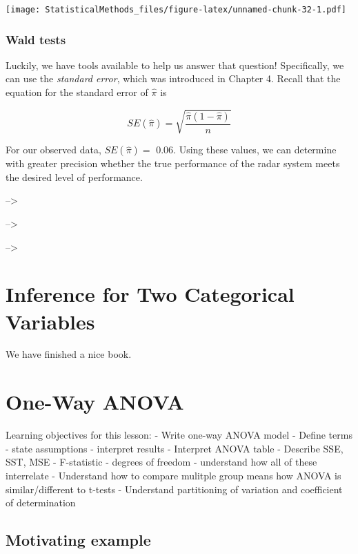 \documentclass[
]{book}
\theoremstyle{definition}
\theoremstyle{definition}
\theoremstyle{definition}
\theoremstyle{remark}
\begin{document}
\texttt{[image: StatisticalMethods\_files/figure-latex/unnamed-chunk-32-1.pdf]}

\hypertarget{wald-tests}{%
\subsection{Wald tests}\label{wald-tests}}

Luckily, we have tools available to help us answer that question! Specifically, we can use the \emph{standard error}, which was introduced in Chapter 4. Recall that the equation for the standard error of \(\hat\pi\) is

\[SE(\hat\pi) = \sqrt{\frac{\hat\pi (1 - \hat\pi)}{n}}\]

For our observed data, \(SE(\hat\pi) =\) 0.06. Using these values, we can determine with greater precision whether the true performance of the radar system meets the desired level of performance.

--\textgreater{}

--\textgreater{}

--\textgreater{}

\hypertarget{twocategorical}{%
\chapter{Inference for Two Categorical Variables}\label{twocategorical}}

We have finished a nice book.

\hypertarget{anova}{%
\chapter{One-Way ANOVA}\label{anova}}

Learning objectives for this lesson:
- Write one-way ANOVA model
- Define terms
- state assumptions
- interpret results
- Interpret ANOVA table
- Describe SSE, SST, MSE
- F-statistic
- degrees of freedom
- understand how all of these interrelate
- Understand how to compare mulitple group means how ANOVA is similar/different to t-tests
- Understand partitioning of variation and coefficient of determination

\hypertarget{motivating-example}{%
\section{Motivating example}\label{motivating-example}}
\end{document}
